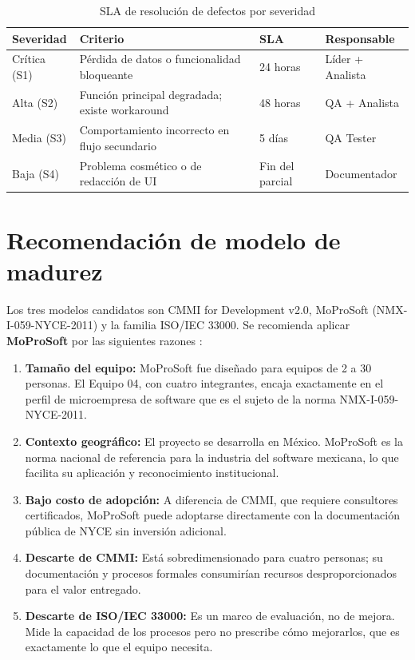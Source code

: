 \documentclass{report}
\begin{document}
\begin{table}[h]
\centering
\begin{tabular}{|p{2cm}|p{5.5cm}|p{1.8cm}|p{3.5cm}|}
\hline
\textbf{Severidad} & \textbf{Criterio} & \textbf{SLA} & \textbf{Responsable} \\
\hline
Crítica (S1) & Pérdida de datos o funcionalidad bloqueante & 24 horas & Líder + Analista \\
\hline
Alta (S2) & Función principal degradada; existe workaround & 48 horas & QA + Analista \\
\hline
Media (S3) & Comportamiento incorrecto en flujo secundario & 5 días & QA Tester \\
\hline
Baja (S4) & Problema cosmético o de redacción de UI & Fin del parcial & Documentador \\
\hline
\end{tabular}
\caption{SLA de resolución de defectos por severidad}
\end{table}

\chapter*{Recomendación de modelo de madurez}

Los tres modelos candidatos son CMMI for Development v2.0, MoProSoft (NMX-I-059-NYCE-2011) y la familia ISO/IEC 33000. Se recomienda aplicar \textbf{MoProSoft} por las siguientes razones \cite{pressman2020}:

\begin{enumerate}
    \item \textbf{Tamaño del equipo:} MoProSoft fue diseñado para equipos de 2 a 30 personas. El Equipo 04, con cuatro integrantes, encaja exactamente en el perfil de microempresa de software que es el sujeto de la norma NMX-I-059-NYCE-2011.
    \item \textbf{Contexto geográfico:} El proyecto se desarrolla en México. MoProSoft es la norma nacional de referencia para la industria del software mexicana, lo que facilita su aplicación y reconocimiento institucional.
    \item \textbf{Bajo costo de adopción:} A diferencia de CMMI, que requiere consultores certificados, MoProSoft puede adoptarse directamente con la documentación pública de NYCE sin inversión adicional.
    \item \textbf{Descarte de CMMI:} Está sobredimensionado para cuatro personas; su documentación y procesos formales consumirían recursos desproporcionados para el valor entregado.
    \item \textbf{Descarte de ISO/IEC 33000:} Es un marco de evaluación, no de mejora. Mide la capacidad de los procesos pero no prescribe cómo mejorarlos, que es exactamente lo que el equipo necesita.
\end{enumerate}
\end{document}
